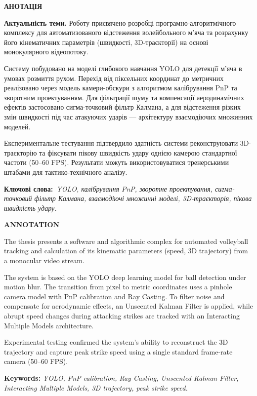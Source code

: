 \begin{center}
\large{\MakeUppercase{\textbf{Анотація}}}
\end{center}


\newcommand{\actuality}{\textbf{Актуальність теми.}}
\newcommand{\aim}{\textbf{Метою}}
\newcommand{\tasks}{\textbf{задачі}}
\newcommand{\contribution}{\textbf{Особистий вклад.}}
\newcommand{\keyword}{\textbf{Ключові слова:}}

{\actuality} Роботу присвячено розробці програмно-алгоритмічного комплексу для автоматизованого відстеження
волейбольного м'яча та розрахунку його кінематичних параметрів (швидкості, 3D-траєкторії) на основі монокулярного
відеопотоку.

Систему побудовано на моделі глибокого навчання YOLO для детекції м'яча в умовах розмиття рухом. Перехід від піксельних
координат до метричних реалізовано через модель камери-обскури з алгоритмом калібрування PnP та зворотним проектуванням.
Для фільтрації шуму та компенсації аеродинамічних ефектів застосовано сигма-точковий фільтр Калмана, а для відстеження
різких змін швидкості під час атакуючих ударів — архітектуру взаємодіючих множинних моделей.

Експериментальне тестування підтвердило здатність системи реконструювати 3D-траєкторію та фіксувати пікову швидкість
удару однією камерою стандартної частоти (50--60 FPS). Результати можуть використовуватися тренерськими штабами для
тактико-технічного аналізу.

\keyword\ \textit{YOLO, калібрування PnP, зворотне проектування, сигма-точковий фільтр Калмана, взаємодіючі множинні
    моделі, 3D-траєкторія, пікова швидкість удару.}

\bigskip

\begin{center}
\large{\MakeUppercase{\textbf{Annotation}}}
\end{center}

The thesis presents a software and algorithmic complex for automated volleyball tracking and calculation of its
kinematic parameters (speed, 3D trajectory) from a monocular video stream.

The system is based on the YOLO deep learning model for ball detection under motion blur. The transition from pixel to
metric coordinates uses a pinhole camera model with PnP calibration and Ray Casting. To filter noise and compensate for
aerodynamic effects, an Unscented Kalman Filter is applied, while abrupt speed changes during attacking strikes are
tracked with an Interacting Multiple Models architecture.

Experimental testing confirmed the system's ability to reconstruct the 3D trajectory and capture peak strike speed using
a single standard frame-rate camera (50--60 FPS).

\textbf{Keywords:} \textit{YOLO, PnP calibration, Ray Casting, Unscented Kalman Filter, Interacting Multiple Models,
    3D trajectory, peak strike speed.}

\newpage
